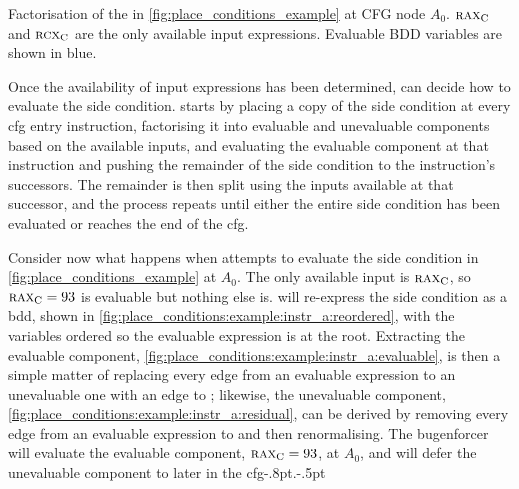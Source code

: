 \begin{sanefig}
{
    \label{fig:place_conditions:example:instr_a:residual}
  }
  \caption{Factorisation of the  in
    \autoref{fig:place_conditions_example} at CFG node $A_0$.
    $\textsc{rax}_{\mathrm{C}}$ and $\textsc{rcx}_{\mathrm{C}}$ are the only available input
    expressions.  Evaluable BDD variables are shown in blue.}
  \label{fig:place_conditions_example:instr_a}
\end{sanefig}

\noindent
Once the availability of input expressions has been determined,
{\technique} can decide how to evaluate the \gls{side condition}.
{\Technique} starts by placing a copy of the \gls{side condition} at every
\gls{cfg} entry instruction, factorising it into evaluable and
unevaluable components based on the available inputs, and evaluating
the evaluable component at that instruction and pushing the remainder
of the \gls{side condition} to the instruction's successors.  The remainder
is then split using the inputs available at that successor, and the
process repeats until either the entire \gls{side condition} has been
evaluated or {\technique} reaches the end of the \gls{cfg}.

Consider now what happens when {\technique} attempts to evaluate the
\gls{side condition} in \autoref{fig:place_conditions_example} at $A_0$.
The only available input is $\textsc{rax}_{\mathrm{C}}$, so $\textsc{rax}_{\mathrm{C}} = 93$
is evaluable but nothing else is.  {\Technique} will re-express the
\gls{side condition} as a \gls{bdd}, shown in
\autoref{fig:place_conditions:example:instr_a:reordered}, with the
variables ordered so the evaluable expression is at the root.
Extracting the evaluable component,
\autoref{fig:place_conditions:example:instr_a:evaluable}, is then a
simple matter of replacing every edge from an evaluable expression to
an unevaluable one with an edge to \true; likewise, the unevaluable
component, \autoref{fig:place_conditions:example:instr_a:residual},
can be derived by removing every edge from an evaluable expression to
{\false} and then renormalising.  The \gls{bugenforcer} will evaluate
the evaluable component, $\textsc{rax}_{\mathrm{C}} = 93$, at $A_0$, and will
defer the unevaluable component to later in the \gls{cfg}\kern-.8pt.\kern-.5pt


